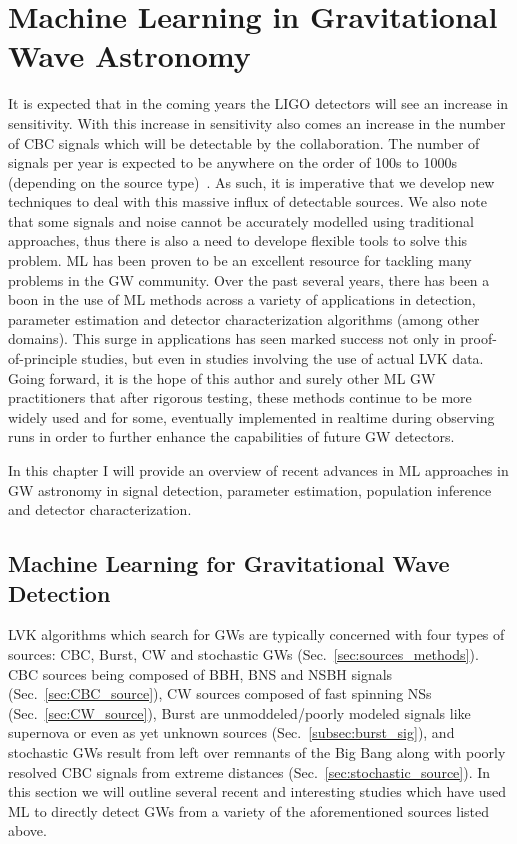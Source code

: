 \chapter[Machine Learning in Gravitational wave Astronomy]{Machine Learning in Gravitational Wave Astronomy}\label{ch:chap_3}

%
%
It is expected that in the coming years the \ac{LIGO} detectors will see an increase in sensitivity. With this increase in sensitivity also comes an increase in the number of \ac{CBC} signals which will be detectable by the collaboration. The number of signals per year is expected to be anywhere on the order of 100s to 1000s (depending on the source type)~\cite{2018LRR....21....3A}. As such, it is imperative that we develop new techniques to deal with this massive influx of detectable sources. We also note that some signals and noise cannot be accurately modelled using traditional approaches, thus there is also a need to develope 
flexible tools to solve this problem. \ac{ML} has been proven to be an excellent resource for tackling many problems in the \ac{GW} community. Over the past several years, there has been a boon in the use of \ac{ML} methods across a variety of applications in detection, parameter estimation and detector characterization algorithms (among other domains). This surge in applications has seen marked success not only in proof-of-principle studies, but even in studies involving the use of actual \ac{LVK} data. Going forward, it is the hope of this author and surely other \ac{ML} \ac{GW} practitioners that after rigorous testing, these methods continue to be more widely used and for some, eventually implemented in realtime during observing runs in 
order to further enhance the capabilities of future \ac{GW} detectors.

In this chapter I will provide an overview of recent advances in \ac{ML} approaches in \ac{GW} astronomy in signal detection, parameter estimation, population inference and detector characterization.

\section{Machine Learning for Gravitational Wave Detection}

\ac{LVK} algorithms which search for \ac{GW}s are typically concerned with four types of sources: \ac{CBC}, Burst, \ac{CW} and stochastic \ac{GW}s 
(Sec.~\ref{sec:sources_methods}). 
\ac{CBC} sources being composed of \ac{BBH}, \ac{BNS} and 
\ac{NSBH} signals (Sec.~\ref{sec:CBC_source}), 
\ac{CW} sources composed of fast spinning \ac{NS}s (Sec.~\ref{sec:CW_source}), Burst are unmoddeled/poorly modeled signals like supernova or even as yet unknown sources (Sec.~\ref{subsec:burst_sig}), and stochastic \ac{GW}s result from left over remnants of the Big Bang along with poorly resolved \ac{CBC} signals from extreme distances (Sec.~\ref{sec:stochastic_source}). In this section we will outline several recent and interesting studies which have used \ac{ML} to directly 
detect \ac{GW}s from a variety of the aforementioned sources listed above.

